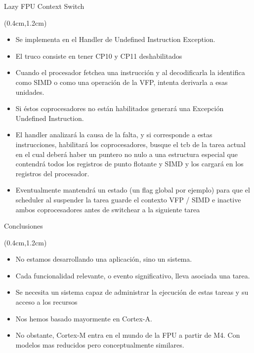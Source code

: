 \begin{frame}{Lazy FPU Context Switch}
 \begin{textblock*}{\textwidth}(0.4cm,1.2cm)
  \begin{itemize}[<+(1)->] \justifying
   \item Se implementa en el Handler de Undefined Instruction Exception.
   \item El truco consiste en tener CP10 y CP11 deshabilitados
   \item Cuando el procesador fetchea una instrucción y al decodificarla la identifica como SIMD o como una operación de la VFP, intenta derivarla a esas unidades. 
   \item Si éstos coprocesadores no están habilitados generará una Excepción Undefined Instruction.
   \item El handler analizará la causa de la falta, y si corresponde a estas instrucciones, habilitará los coprocesadores, busque el tcb de la tarea actual en el cual deberá haber un puntero no nulo a una estructura especial que contendrá todos los registros de punto flotante y SIMD y los cargará en los registros del procesador.
   \item Eventualmente mantendrá un estado (un flag global por ejemplo) para que el scheduler al suspender la tarea guarde el contexto VFP / SIMD e inactive ambos coprocesadores antes de switchear a la siguiente tarea
  \end{itemize}
 \end{textblock*}
\end{frame}

\begin{frame}{Conclusiones}
 \begin{textblock*}{\textwidth}(0.4cm,1.2cm)
  \begin{itemize}[<+(1)->] \justifying
   \item No estamos desarrollando una aplicación, sino un sistema.
   \item Cada funcionalidad relevante, o evento significativo, lleva asociada una tarea.
   \item Se necesita un sistema capaz de administrar la ejecución de estas tareas y su acceso a los recursos
   \item Nos hemos basado mayormente en Cortex-A. 
   \item No obstante, Cortex-M entra en el mundo de la FPU a partir de M4. Con modelos mas reducidos pero conceptualmente similares.
  \end{itemize}
 \end{textblock*}
\end{frame}


